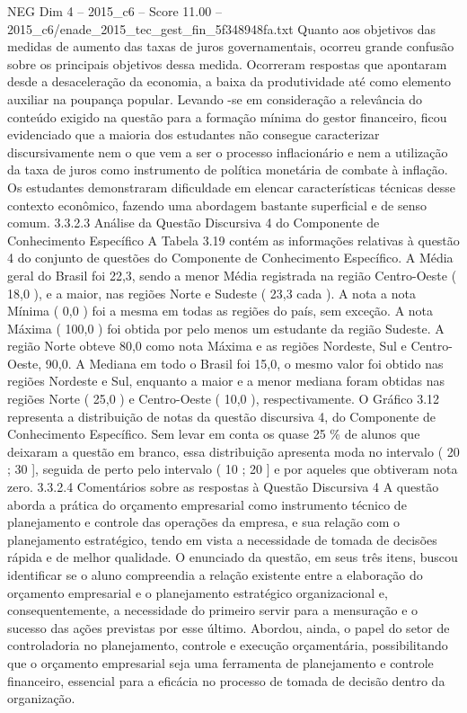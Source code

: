 \begin{textsample}{NEG Dim 4 – 2015\_c6 – Score 11.00 – 2015\_c6/enade\_2015\_tec\_gest\_fin\_5f348948fa.txt}
Quanto aos objetivos das medidas de aumento das taxas de juros governamentais, ocorreu grande confusão sobre os principais objetivos dessa medida.
Ocorreram respostas que apontaram desde a desaceleração da economia, a baixa da produtividade até como elemento auxiliar na poupança popular.
Levando -se em consideração a relevância do conteúdo exigido na questão para a formação mínima do gestor financeiro, ficou evidenciado que a maioria dos estudantes não consegue caracterizar discursivamente nem o que vem a ser o processo inflacionário e nem a utilização da taxa de juros como instrumento de política monetária de combate à inflação.
Os estudantes demonstraram dificuldade em elencar características técnicas desse contexto econômico, fazendo uma abordagem bastante superficial e de senso comum. 3.3.2.3 Análise da Questão Discursiva 4 do Componente de Conhecimento Específico A Tabela 3.19 contém as informações relativas à questão 4 do conjunto de questões do Componente de Conhecimento Específico.
A Média geral do Brasil foi 22,3, sendo a menor Média registrada na região Centro-Oeste ( 18,0 ), e a maior, nas regiões Norte e Sudeste ( 23,3 cada ).
A nota a nota Mínima ( 0,0 ) foi a mesma em todas as regiões do país, sem exceção.
A nota Máxima ( 100,0 ) foi obtida por pelo menos um estudante da região Sudeste.
A região Norte obteve 80,0 como nota Máxima e as regiões Nordeste, Sul e Centro-Oeste, 90,0.
A Mediana em todo o Brasil foi 15,0, o mesmo valor foi obtido nas regiões Nordeste e Sul, enquanto a maior e a menor mediana foram obtidas nas regiões Norte ( 25,0 ) e Centro-Oeste ( 10,0 ), respectivamente.
O Gráfico 3.12 representa a distribuição de notas da questão discursiva 4, do Componente de Conhecimento Específico.
Sem levar em conta os quase 25 \% de alunos que deixaram a questão em branco, essa distribuição apresenta moda no intervalo ( 20 ; 30 ], seguida de perto pelo intervalo ( 10 ; 20 ] e por aqueles que obtiveram nota zero. 3.3.2.4 Comentários sobre as respostas à Questão Discursiva 4 A questão aborda a prática do orçamento empresarial como instrumento técnico de planejamento e controle das operações da empresa, e sua relação com o planejamento estratégico, tendo em vista a necessidade de tomada de decisões rápida e de melhor qualidade.
O enunciado da questão, em seus três itens, buscou identificar se o aluno compreendia a relação existente entre a elaboração do orçamento empresarial e o planejamento estratégico organizacional e, consequentemente, a necessidade do primeiro servir para a mensuração e o sucesso das ações previstas por esse último.
Abordou, ainda, o papel do setor de controladoria no planejamento, controle e execução orçamentária, possibilitando que o orçamento empresarial seja uma ferramenta de planejamento e controle financeiro, essencial para a eficácia no processo de tomada de decisão dentro da organização.

\end{textsample}
